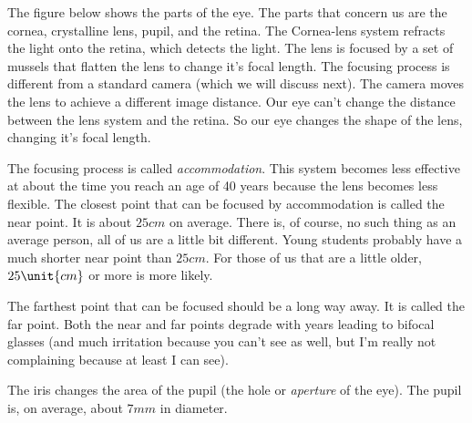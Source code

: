 \documentclass{article}
\begin{document}
The figure below shows the parts of the eye. The parts that concern us are
the cornea, crystalline lens, pupil, and the retina. The Cornea-lens system refracts
the light onto the retina, which detects the light. The lens is focused by a
set of mussels that flatten the lens to change it's focal length. The
focusing process is different from a standard camera (which we will discuss
next). The camera moves the lens to achieve a different image distance. Our
eye can't change the distance between the lens system and the retina. So our
eye changes the shape of the lens, changing it's focal length. 

The focusing process is called \emph{accommodation}. This system becomes
less effective at about the time you reach an age of 40 years because the
lens becomes less flexible. The closest point that can be focused by
accommodation is called the near point. It is about $25\unit{cm}$ on
average. There is, of course, no such thing as an average person, all of us
are a little bit different. Young students probably have a much shorter near
point than $25\unit{cm}.$ For those of us that are a little older, $25\unit{%
cm}$ or more is more likely.

The farthest point that can be focused should be a long way away. It is
called the far point. Both the near and far points degrade with years
leading to bifocal glasses (and much irritation because you can't see as
well, but I'm really not complaining because at least I can see).

The iris changes the area of the pupil (the hole or \emph{aperture} of the
eye). The pupil is, on average, about $7\unit{mm}$ in diameter.
\end{document}
